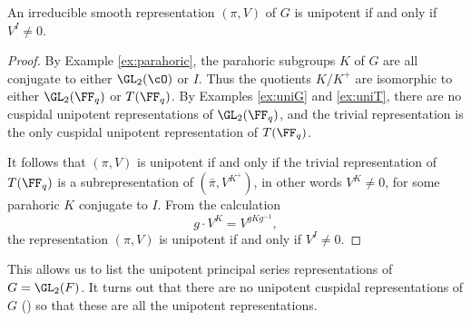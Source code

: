 \begin{prop}\label{prop:unipotent}
    An irreducible smooth representation $(\pi,V)$ of $G$ is unipotent if and only if $V^I \neq 0$.
\end{prop}
\begin{proof}
    By Example \ref{ex:parahoric}, the parahoric subgroups $K$ of $G$ are all conjugate to either $\GL_2(\cO)$ or $I$. Thus the quotients $K/K^+$ are isomorphic to either $\GL_2(\FF_q)$ or $T(\FF_q)$. By Examples \ref{ex:uniG} and \ref{ex:uniT}, there are no cuspidal unipotent representations of $\GL_2(\FF_q)$, and the trivial representation is the only cuspidal unipotent representation of $T(\FF_q)$.

    It follows that $(\pi,V)$ is unipotent if and only if the trivial representation of $T(\FF_q)$ is a subrepresentation of $(\bar{\pi},V^{K^+})$, in other words $V^K \neq 0$, for some parahoric $K$ conjugate to $I$. From the calculation 
    $$g \cdot V^K = V^{gKg^{-1}},$$ the representation $(\pi,V)$ is unipotent if and only if $V^I \neq 0$.
\end{proof}

This allows us to list the unipotent principal series representations of $G=\GL_2(F)$. It turns out that there are no unipotent cuspidal representations of $G$ (\cite[Proposition 14.3]{BH1}) so that these are all the unipotent representations.

